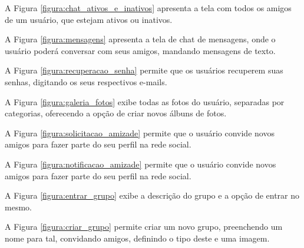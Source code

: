 
A Figura \ref{figura:chat_ativos_e_inativos} apresenta a tela com todos os amigos de um usuário, que estejam ativos ou inativos.


A Figura \ref{figura:mensagens} apresenta a tela de chat de mensagens, onde o usuário poderá conversar com seus amigos, mandando mensagens de texto.


A Figura \ref{figura:recuperacao_senha} permite que os usuários recuperem suas senhas, digitando os seus respectivos e-mails.


A Figura \ref{figura:galeria_fotos} exibe todas as fotos do usuário, separadas por categorias, oferecendo a opção de criar novos álbuns de fotos.


A Figura \ref{figura:solicitacao_amizade} permite que o usuário convide novos amigos para fazer parte do seu perfil na rede social.


A Figura \ref{figura:notificacao_amizade} permite que o usuário convide novos amigos para fazer parte do seu perfil na rede social.


A Figura \ref{figura:entrar_grupo} exibe a descrição do grupo e a opção de entrar no mesmo.


A Figura \ref{figura:criar_grupo} permite criar um novo grupo, preenchendo um nome para tal, convidando amigos, definindo o tipo deste e uma imagem.

